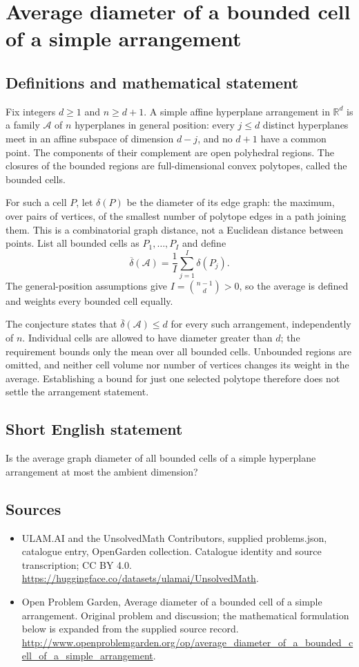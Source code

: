 \documentclass[11pt,a4paper]{article}
\begin{document}
\section*{Average diameter of a bounded cell of a simple arrangement}\label{statement}

\subsection{Definitions and mathematical statement}
Fix integers $d\ge1$ and $n\ge d+1$. A simple affine hyperplane
arrangement in $\mathbb R^d$ is a family $\mathcal A$ of $n$ hyperplanes
in general position: every $j\le d$ distinct hyperplanes meet in an
affine subspace of dimension $d-j$, and no $d+1$ have a common point.
The components of their complement are open polyhedral regions.
The closures of the bounded regions are full-dimensional convex polytopes,
called the bounded cells.

For such a cell $P$, let $\delta(P)$ be the diameter of its edge graph:
the maximum, over pairs of vertices, of the smallest number of polytope
edges in a path joining them. This is a combinatorial graph distance,
not a Euclidean distance between points. List all bounded cells as
$P_1,\ldots,P_I$ and define
\[
 \overline\delta(\mathcal A)=\frac1I\sum_{j=1}^I\delta(P_j).
\]
The general-position assumptions give $I=\binom{n-1}{d}>0$, so the
average is defined and weights every bounded cell equally.

The conjecture states that
$\overline\delta(\mathcal A)\le d$ for every such arrangement, independently
of $n$. Individual cells are allowed to have diameter greater than $d$;
the requirement bounds only the mean over all bounded cells.
Unbounded regions are omitted, and neither cell volume nor number of
vertices changes its weight in the average. Establishing a bound for just
one selected polytope therefore does not settle the arrangement statement.
\subsection{Short English statement}
Is the average graph diameter of all bounded cells of a simple hyperplane arrangement at most the ambient dimension?
\subsection{Sources}
\begin{itemize}
\item[S1] ULAM.AI and the UnsolvedMath Contributors, supplied problems.json, catalogue entry, OpenGarden collection. Catalogue identity and source transcription; CC BY 4.0.
\url{https://huggingface.co/datasets/ulamai/UnsolvedMath}.
\item[S2] Open Problem Garden, Average diameter of a bounded cell of a simple arrangement. Original problem and discussion; the mathematical formulation below is expanded from the supplied source record.
\url{http://www.openproblemgarden.org/op/average_diameter_of_a_bounded_cell_of_a_simple_arrangement}.
\end{itemize}
\end{document}
